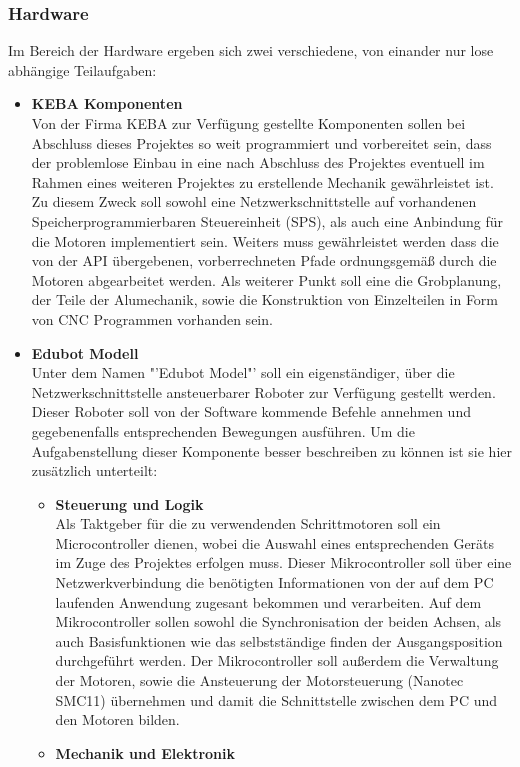 \subsubsection{Hardware}
Im Bereich der Hardware ergeben sich zwei verschiedene, von einander nur lose abhängige Teilaufgaben:
\begin{itemize}
\item \textbf{KEBA Komponenten}\\
Von der Firma KEBA zur Verfügung gestellte Komponenten sollen bei Abschluss dieses Projektes so weit programmiert und vorbereitet sein, dass der problemlose Einbau in eine nach Abschluss des Projektes eventuell im Rahmen eines weiteren Projektes zu erstellende Mechanik gewährleistet ist. Zu diesem Zweck soll sowohl eine Netzwerkschnittstelle auf vorhandenen Speicherprogrammierbaren Steuereinheit (SPS), als auch eine Anbindung für die Motoren implementiert sein. Weiters muss gewährleistet werden dass die von der API übergebenen, vorberrechneten Pfade ordnungsgemäß durch die Motoren abgearbeitet werden.
Als weiterer Punkt soll eine die Grobplanung, der Teile der Alumechanik, sowie die Konstruktion von Einzelteilen in Form von CNC Programmen vorhanden sein.
\item \textbf{Edubot Modell}\\
Unter dem Namen "'Edubot Model"' soll ein eigenständiger, über die Netzwerkschnittstelle ansteuerbarer Roboter zur Verfügung gestellt werden. Dieser Roboter soll von der Software kommende Befehle annehmen und gegebenenfalls entsprechenden Bewegungen ausführen. Um die Aufgabenstellung dieser Komponente besser beschreiben zu können ist sie hier zusätzlich unterteilt:
\begin{itemize}
\item \textbf{Steuerung und Logik}\\
Als Taktgeber für die zu verwendenden Schrittmotoren soll ein Microcontroller dienen, wobei die Auswahl eines entsprechenden Geräts im Zuge des Projektes erfolgen muss. Dieser Mikrocontroller soll über eine Netzwerkverbindung die benötigten Informationen von der auf dem PC laufenden Anwendung zugesant bekommen und verarbeiten.
Auf dem Mikrocontroller sollen sowohl die Synchronisation der beiden Achsen, als auch Basisfunktionen wie das selbstständige finden der Ausgangsposition durchgeführt werden. Der Mikrocontroller soll außerdem die Verwaltung der Motoren, sowie die Ansteuerung der Motorsteuerung (Nanotec SMC11) übernehmen und damit die Schnittstelle zwischen dem PC und den Motoren bilden.
\item \textbf{Mechanik und Elektronik}\\

\end{itemize}
\end{itemize}
